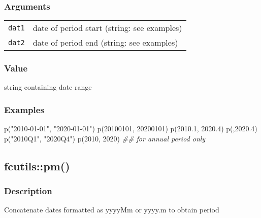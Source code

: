 \documentclass[
  letterpaper,
  DIV=11,
  numbers=noendperiod]{scrreport}
\newenvironment{Shaded}{\begin{snugshade}}{\end{snugshade}}
\newcommand{\DecValTok}[1]{\textcolor[rgb]{0.68,0.00,0.00}{#1}}
\newcommand{\DocumentationTok}[1]{\textcolor[rgb]{0.37,0.37,0.37}{\textit{#1}}}
\newcommand{\FloatTok}[1]{\textcolor[rgb]{0.68,0.00,0.00}{#1}}
\newcommand{\FunctionTok}[1]{\textcolor[rgb]{0.28,0.35,0.67}{#1}}
\newcommand{\NormalTok}[1]{\textcolor[rgb]{0.00,0.23,0.31}{#1}}
\newcommand{\StringTok}[1]{\textcolor[rgb]{0.13,0.47,0.30}{#1}}
\begin{document}
\subsubsection{Arguments}\label{arguments-19}

\begin{longtable}[]{@{}ll@{}}
\toprule\noalign{}
\endhead
\bottomrule\noalign{}
\endlastfoot
\texttt{dat1} & date of period start (string: see examples) \\
\texttt{dat2} & date of period end (string: see examples) \\
\end{longtable}

\subsubsection{Value}\label{value-19}

string containing date range

\subsubsection{Examples}\label{examples-19}

\begin{Shaded}
\begin{Highlighting}[]
\FunctionTok{p}\NormalTok{(}\StringTok{"2010{-}01{-}01"}\NormalTok{, }\StringTok{"2020{-}01{-}01"}\NormalTok{)}
\FunctionTok{p}\NormalTok{(}\DecValTok{20100101}\NormalTok{, }\DecValTok{20200101}\NormalTok{)}
\FunctionTok{p}\NormalTok{(}\FloatTok{2010.1}\NormalTok{, }\FloatTok{2020.4}\NormalTok{)}
\FunctionTok{p}\NormalTok{(,}\FloatTok{2020.4}\NormalTok{)}
\FunctionTok{p}\NormalTok{(}\StringTok{"2010Q1"}\NormalTok{, }\StringTok{"2020Q4"}\NormalTok{)}
\FunctionTok{p}\NormalTok{(}\DecValTok{2010}\NormalTok{, }\DecValTok{2020}\NormalTok{) }\DocumentationTok{\#\# for annual period only}
\end{Highlighting}
\end{Shaded}

\subsection{fcutils::pm()}\label{fcutilspm}

\subsubsection{Description}\label{description-20}

Concatenate dates formatted as yyyyMm or yyyy.m to obtain period
\end{document}
